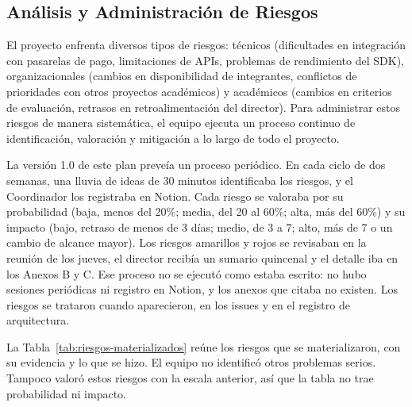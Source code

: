 \subsection{Análisis y Administración de Riesgos}

El proyecto enfrenta diversos tipos de riesgos: técnicos (dificultades en integración con pasarelas de pago, limitaciones de APIs, problemas de rendimiento del SDK), organizacionales (cambios en disponibilidad de integrantes, conflictos de prioridades con otros proyectos académicos) y académicos (cambios en criterios de evaluación, retrasos en retroalimentación del director). Para administrar estos riesgos de manera sistemática, el equipo ejecuta un proceso continuo de identificación, valoración y mitigación a lo largo de todo el proyecto.

La versión 1.0 de este plan preveía un proceso periódico. En cada ciclo de dos semanas, una lluvia de ideas de 30 minutos identificaba los riesgos, y el Coordinador los registraba en Notion. Cada riesgo se valoraba por su probabilidad (baja, menos del 20\%; media, del 20 al 60\%; alta, más del 60\%) y su impacto (bajo, retraso de menos de 3 días; medio, de 3 a 7; alto, más de 7 o un cambio de alcance mayor). Los riesgos amarillos y rojos se revisaban en la reunión de los jueves, el director recibía un sumario quincenal y el detalle iba en los Anexos B y C. Ese proceso no se ejecutó como estaba escrito: no hubo sesiones periódicas ni registro en Notion, y los anexos que citaba no existen. Los riesgos se trataron cuando aparecieron, en los issues y en el registro de arquitectura.

La Tabla~\ref{tab:riesgos-materializados} reúne los riesgos que se materializaron, con su evidencia y lo que se hizo. El equipo no identificó otros problemas serios. Tampoco valoró estos riesgos con la escala anterior, así que la tabla no trae probabilidad ni impacto.

